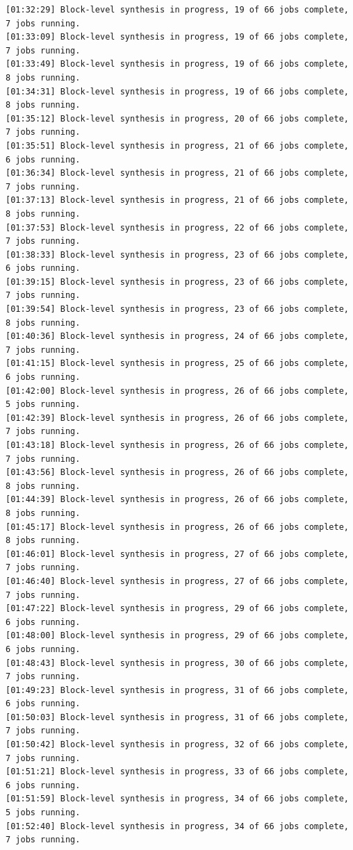 \begin{lstlisting}[label=code, basicstyle=\tiny, caption=Листинг файла v++\_vinc.log]
[01:32:29] Block-level synthesis in progress, 19 of 66 jobs complete, 7 jobs running.
[01:33:09] Block-level synthesis in progress, 19 of 66 jobs complete, 7 jobs running.
[01:33:49] Block-level synthesis in progress, 19 of 66 jobs complete, 8 jobs running.
[01:34:31] Block-level synthesis in progress, 19 of 66 jobs complete, 8 jobs running.
[01:35:12] Block-level synthesis in progress, 20 of 66 jobs complete, 7 jobs running.
[01:35:51] Block-level synthesis in progress, 21 of 66 jobs complete, 6 jobs running.
[01:36:34] Block-level synthesis in progress, 21 of 66 jobs complete, 7 jobs running.
[01:37:13] Block-level synthesis in progress, 21 of 66 jobs complete, 8 jobs running.
[01:37:53] Block-level synthesis in progress, 22 of 66 jobs complete, 7 jobs running.
[01:38:33] Block-level synthesis in progress, 23 of 66 jobs complete, 6 jobs running.
[01:39:15] Block-level synthesis in progress, 23 of 66 jobs complete, 7 jobs running.
[01:39:54] Block-level synthesis in progress, 23 of 66 jobs complete, 8 jobs running.
[01:40:36] Block-level synthesis in progress, 24 of 66 jobs complete, 7 jobs running.
[01:41:15] Block-level synthesis in progress, 25 of 66 jobs complete, 6 jobs running.
[01:42:00] Block-level synthesis in progress, 26 of 66 jobs complete, 5 jobs running.
[01:42:39] Block-level synthesis in progress, 26 of 66 jobs complete, 7 jobs running.
[01:43:18] Block-level synthesis in progress, 26 of 66 jobs complete, 7 jobs running.
[01:43:56] Block-level synthesis in progress, 26 of 66 jobs complete, 8 jobs running.
[01:44:39] Block-level synthesis in progress, 26 of 66 jobs complete, 8 jobs running.
[01:45:17] Block-level synthesis in progress, 26 of 66 jobs complete, 8 jobs running.
[01:46:01] Block-level synthesis in progress, 27 of 66 jobs complete, 7 jobs running.
[01:46:40] Block-level synthesis in progress, 27 of 66 jobs complete, 7 jobs running.
[01:47:22] Block-level synthesis in progress, 29 of 66 jobs complete, 6 jobs running.
[01:48:00] Block-level synthesis in progress, 29 of 66 jobs complete, 6 jobs running.
[01:48:43] Block-level synthesis in progress, 30 of 66 jobs complete, 7 jobs running.
[01:49:23] Block-level synthesis in progress, 31 of 66 jobs complete, 6 jobs running.
[01:50:03] Block-level synthesis in progress, 31 of 66 jobs complete, 7 jobs running.
[01:50:42] Block-level synthesis in progress, 32 of 66 jobs complete, 7 jobs running.
[01:51:21] Block-level synthesis in progress, 33 of 66 jobs complete, 6 jobs running.
[01:51:59] Block-level synthesis in progress, 34 of 66 jobs complete, 5 jobs running.
[01:52:40] Block-level synthesis in progress, 34 of 66 jobs complete, 7 jobs running.

\end{lstlisting}
